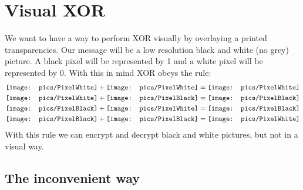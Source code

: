 \documentclass[a4paper,10pt]{article}
\newcommand{\pxWhite}{
 {\mathchoice
  {\texttt{[image: pics/PixelWhite]}}
  {\texttt{[image: pics/PixelWhite]}}
  {\texttt{[image: pics/PixelWhite]}}
  {\texttt{[image: pics/PixelWhite]}}
 }
}
\newcommand{\LL}{\mathord{\texttt{[image: pics/L]}}}
\newcommand{\RR}{\mathord{\texttt{[image: pics/R]}}}
\newcommand{\BB}{\mathord{\texttt{[image: pics/B]}}}
\newcommand{\pxBlack}{\mathord{\texttt{[image: pics/PixelBlack]}}}
\begin{document}
\section{Visual XOR}

We want to have a way to perform XOR visually by overlaying a printed transparencies. Our message will be a low resolution black and white (no grey) picture. A black pixel will be represented by 1 and a white pixel will be represented by 0. With this in mind XOR obeys the rule:
\begin{align*}
 \pxWhite+\pxWhite=\pxWhite \\
 \pxWhite+\pxBlack=\pxBlack \\
 \pxBlack+\pxWhite=\pxBlack \\
 \pxBlack+\pxBlack=\pxWhite
\end{align*}
With this rule we can encrypt and decrypt black and white pictures, but not in a visual way.



\subsection{The inconvenient way}
\end{document}
